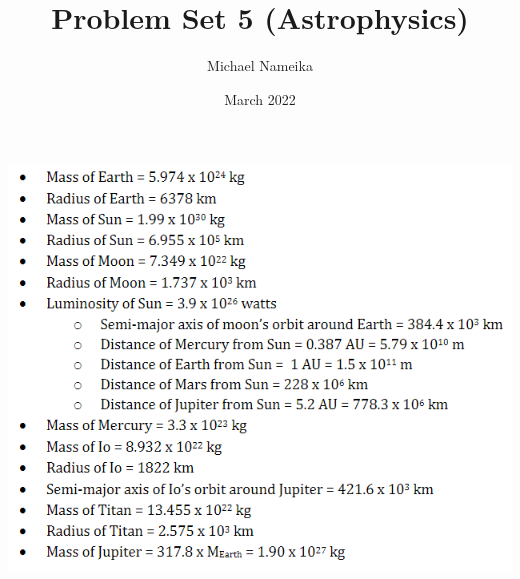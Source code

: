 \documentclass{article}
\title{Problem Set 5 (Astrophysics)}
\author{Michael Nameika}
\date{March 2022}
\begin{document}
\maketitle
\begin{center}
    \includegraphics[scale = 0.8]{probset5data.PNG}
\end{center}
\end{document}
